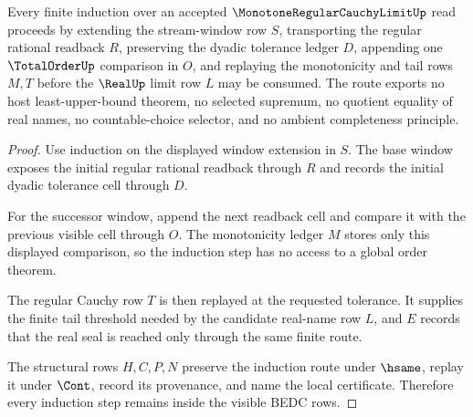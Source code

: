 \begin{theorem}
\label{thm:monotone-regular-cauchy-limit-induction-route}
Every finite induction over an accepted $\MonotoneRegularCauchyLimitUp$ read proceeds by extending the stream-window row $S$, transporting the regular rational readback $R$, preserving the dyadic tolerance ledger $D$, appending one $\TotalOrderUp$ comparison in $O$, and replaying the monotonicity and tail rows $M,T$ before the $\RealUp$ limit row $L$ may be consumed. The route exports no host least-upper-bound theorem, no selected supremum, no quotient equality of real names, no countable-choice selector, and no ambient completeness principle.
\end{theorem}
\begin{proof}
Use induction on the displayed window extension in $S$. The base window exposes the initial regular rational readback through $R$ and records the initial dyadic tolerance cell through $D$.

For the successor window, append the next readback cell and compare it with the previous visible cell through $O$. The monotonicity ledger $M$ stores only this displayed comparison, so the induction step has no access to a global order theorem.

The regular Cauchy row $T$ is then replayed at the requested tolerance. It supplies the finite tail threshold needed by the candidate real-name row $L$, and $E$ records that the real seal is reached only through the same finite route.

The structural rows $H,C,P,N$ preserve the induction route under $\hsame$, replay it under $\Cont$, record its provenance, and name the local certificate. Therefore every induction step remains inside the visible BEDC rows.
\end{proof}



